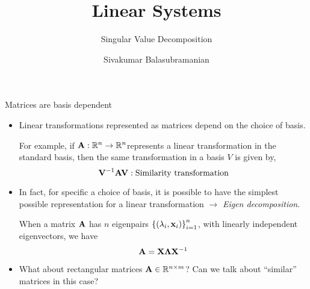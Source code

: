 \documentclass[aspectratio=169]{beamer}
\title{Linear Systems}
\subtitle{Singular Value Decomposition}
\author{Sivakumar Balasubramanian}
\institute[Christian Medical College] %
{
  \inst{}%
  Department of Bioengineering\\
  Christian Medical College, Bagayam\\
  Vellore 632002
}
\date{}
\def\mf{\ensuremath\mathbf}
\def\mb{\ensuremath\mathbb}
\def\lp{\ensuremath\left(}
\def\rp{\ensuremath\right)}
\def\lc{\ensuremath\left\{}
\def\rc{\ensuremath\right\}}
\begin{document}


\begin{frame}
  \titlepage
\end{frame}



\begin{frame}[t]{Matrices are basis dependent}
\begin{itemize}
    \item Linear transformations represented as matrices depend on the choice of basis.

    For example, if $\mf{A}: \mb{R}^n \to \mb{R}^n$represents a linear transformation in the standard basis, then the same transformation in a basis $V$ is given by,
    \[ \mf{V}^{-1}\mf{A}\mf{V}: \text{Similarity transformation} \]

    \item In fact, for specific a choice of basis, it is possible to have the simplest possible representation for a linear transformation $\longrightarrow$ \textit{Eigen decomposition}.

    When a matrix $\mf{A}$ has $n$ eigenpairs $\lc\lp\lambda_i, \mf{x}_i\rp\rc_{i=1}^{n}$, with linearly independent eigenvectors, we have
    \[ \mf{A} = \mf{X}\mf{\Lambda}\mf{X}^{-1} \]

    \item What about rectangular matrices $\mf{A} \in \mb{R}^{n \times m}$? Can we talk about ``similar'' matrices in this case?
\end{itemize}
\end{frame}
\end{document}
